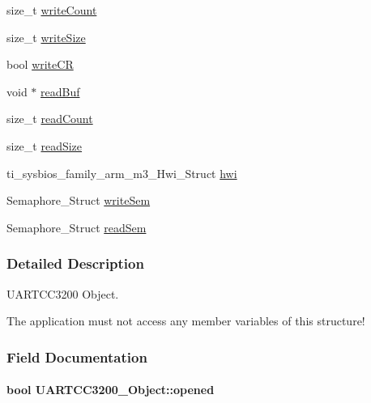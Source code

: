 \begin{DoxyCompactItemize}
\item 
size\-\_\-t \hyperlink{struct_u_a_r_t_c_c3200___object_a4c86feb4f6b6fbb006190c39befb7983}{write\-Count}
\item 
size\-\_\-t \hyperlink{struct_u_a_r_t_c_c3200___object_a3622ef828b2e49d747ccc609d4901cf9}{write\-Size}
\item 
bool \hyperlink{struct_u_a_r_t_c_c3200___object_a14ba39286cc69c68524558fd109d9679}{write\-C\-R}
\item 
void $\ast$ \hyperlink{struct_u_a_r_t_c_c3200___object_a5ceaf39a1b099820ce4181c4443d1801}{read\-Buf}
\item 
size\-\_\-t \hyperlink{struct_u_a_r_t_c_c3200___object_ae522c92db103926250edf8635fbf700d}{read\-Count}
\item 
size\-\_\-t \hyperlink{struct_u_a_r_t_c_c3200___object_ad58d2a42f36df0f01092b61f2ddb3ab2}{read\-Size}
\item 
ti\-\_\-sysbios\-\_\-family\-\_\-arm\-\_\-m3\-\_\-\-Hwi\-\_\-\-Struct \hyperlink{struct_u_a_r_t_c_c3200___object_a3f865a7eab319abf584688efb55ad45a}{hwi}
\item 
Semaphore\-\_\-\-Struct \hyperlink{struct_u_a_r_t_c_c3200___object_a2e92b8d6331233c43fd12c8b5ef9ec65}{write\-Sem}
\item 
Semaphore\-\_\-\-Struct \hyperlink{struct_u_a_r_t_c_c3200___object_ab5bedb5aad0d9022d6dde6a4a6b49889}{read\-Sem}
\end{DoxyCompactItemize}


\subsubsection{Detailed Description}
U\-A\-R\-T\-C\-C3200 Object. 

The application must not access any member variables of this structure! 

\subsubsection{Field Documentation}
\paragraph[{opened}]{\setlength{\rightskip}{0pt plus 5cm}bool U\-A\-R\-T\-C\-C3200\-\_\-\-Object\-::opened}\label{struct_u_a_r_t_c_c3200___object_af160ca68e9cf96890d47d4fa0acd4926}
